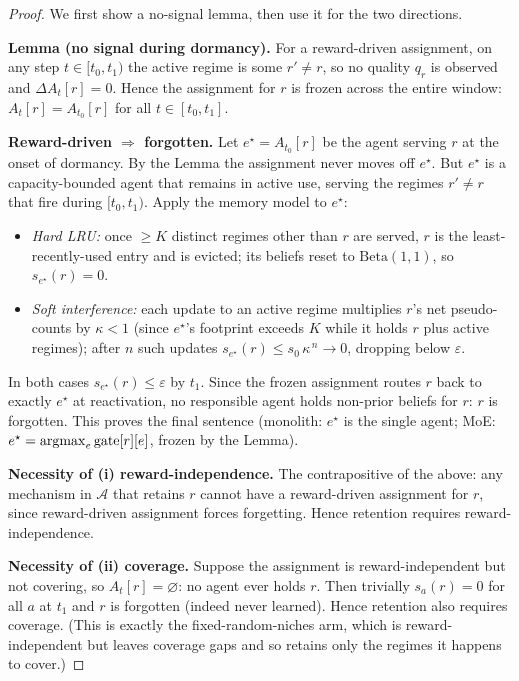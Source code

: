 \documentclass[11pt,a4paper]{article}
\theoremstyle{definition}
\theoremstyle{plain}
\newcommand{\argmax}{\operatornamewithlimits{argmax}}
\begin{document}
\begin{proof}
We first show a no-signal lemma, then use it for the two directions.

\textbf{Lemma (no signal during dormancy).} For a reward-driven assignment, on any
step $t \in [t_0, t_1)$ the active regime is some $r' \neq r$, so no quality
$q_r$ is observed and $\Delta A_t[r] = 0$. Hence the assignment for $r$ is frozen
across the entire window: $A_{t}[r] = A_{t_0}[r]$ for all $t \in [t_0, t_1]$.

\textbf{Reward-driven $\Rightarrow$ forgotten.} Let $e^\star = A_{t_0}[r]$ be the
agent serving $r$ at the onset of dormancy. By the Lemma the assignment never
moves off $e^\star$. But $e^\star$ is a capacity-bounded agent that remains in
active use, serving the regimes $r' \neq r$ that fire during $[t_0,t_1)$. Apply
the memory model to $e^\star$:
\begin{itemize}
    \item \emph{Hard LRU:} once $\ge K$ distinct regimes other than $r$ are served,
    $r$ is the least-recently-used entry and is evicted; its beliefs reset to
    $\mathrm{Beta}(1,1)$, so $s_{e^\star}(r) = 0$.
    \item \emph{Soft interference:} each update to an active regime multiplies
    $r$'s net pseudo-counts by $\kappa < 1$ (since $e^\star$'s footprint exceeds
    $K$ while it holds $r$ plus active regimes); after $n$ such updates
    $s_{e^\star}(r) \le s_{0}\,\kappa^{\,n} \to 0$, dropping below $\varepsilon$.
\end{itemize}
In both cases $s_{e^\star}(r) \le \varepsilon$ by $t_1$. Since the frozen
assignment routes $r$ back to exactly $e^\star$ at reactivation, no responsible
agent holds non-prior beliefs for $r$: $r$ is forgotten. This proves the final
sentence (monolith: $e^\star$ is the single agent; MoE: $e^\star = \argmax_e
\mathrm{gate}[r][e]$, frozen by the Lemma).

\textbf{Necessity of (i) reward-independence.} The contrapositive of the above:
any mechanism in $\mathcal{A}$ that retains $r$ cannot have a reward-driven
assignment for $r$, since reward-driven assignment forces forgetting. Hence
retention requires reward-independence.

\textbf{Necessity of (ii) coverage.} Suppose the assignment is reward-independent
but not covering, so $A_t[r] = \varnothing$: no agent ever holds $r$. Then trivially
$s_a(r) = 0$ for all $a$ at $t_1$ and $r$ is forgotten (indeed never learned).
Hence retention also requires coverage. (This is exactly the fixed-random-niches
arm, which is reward-independent but leaves coverage gaps and so retains only the
regimes it happens to cover.)


\end{proof}
\end{document}
